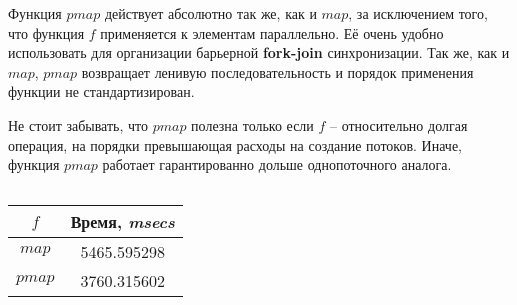 
Функция $pmap$ действует абсолютно так же, как и $map$, за исключением того, что функция $f$ применяется к элементам параллельно. Её очень удобно использовать для организации барьерной \textbf{fork-join} синхронизации. Так же, как и $map$, $pmap$ возвращает ленивую последовательность и порядок применения функции не стандартизирован.

Не стоит забывать, что $pmap$ полезна только если $f$ -- относительно долгая операция, на порядки превышающая расходы на создание потоков. Иначе, функция $pmap$ работает гарантированно дольше однопоточного аналога.

\inputminted[fontsize=\small, firstline=42,lastline=57]{clj}{src/book.clj}

\begin{center}
  \begin{tabular}{|c|c|}
    \hline
    $f$ & Время, \textit{msecs} \\
    \hline
    $map$ & 5465.595298  \\
    \hline
    $pmap$ & 3760.315602  \\
    \hline
  \end{tabular}
\end{center}



